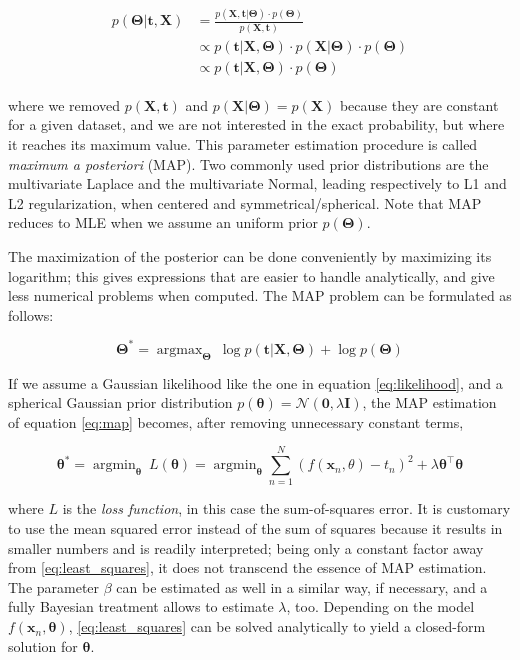 \documentclass[a4paper,11pt]{kth-mag}
\DeclareMathOperator*{\argmin}{argmin}
\DeclareMathOperator*{\argmax}{argmax}
\begin{document}
\begin{align}
\begin{split}
\label{eq:map}
p(\bm\Theta\vert\bm t, \bm X)&=\frac{p(\bm X, \bm t\vert\bm\Theta)\cdot p(\bm\Theta)}{p(\bm X, \bm t)}\\
&\propto p(\bm t\vert \bm X,\bm\Theta)\cdot p(\bm X\vert\bm\Theta)\cdot p(\bm\Theta)\\
&\propto p(\bm t\vert \bm X,\bm\Theta)\cdot p(\bm\Theta)
\end{split}
\end{align}


\noindent where we removed $p(\bm X,\bm t)$ and $p(\bm X\vert\bm\Theta)=p(\bm X)$ because they are constant for a given dataset, and we are not interested in the exact probability, but where it reaches its maximum value. This parameter estimation procedure is called \emph{maximum a posteriori} (MAP). Two commonly used prior distributions are the multivariate Laplace and the multivariate Normal, leading respectively to L1 and L2 regularization, when centered and symmetrical/spherical. Note that MAP reduces to MLE when we assume an uniform prior $p(\bm\Theta)$.

The maximization of the posterior can be done conveniently by maximizing its logarithm; this gives expressions that are easier to handle analytically, and give less numerical problems when computed. The MAP problem can be formulated as follows:

\begin{equation}
\bm\Theta^*=\argmax_{\bm\Theta}\ \log p(\bm t\vert\bm X,\bm\Theta)+\log p(\bm\Theta)
\end{equation}


If we assume a Gaussian likelihood like the one in equation \ref{eq:likelihood}, and a spherical Gaussian prior distribution $p(\bm\theta)=\mathcal{N}(\bm 0, \lambda\bm I)$, the MAP estimation of equation \ref{eq:map} becomes, after removing unnecessary constant terms,

\begin{equation}
\label{eq:least_squares}
\bm\theta^*=\argmin_{\bm\theta}\ L(\bm\theta)=\argmin_{\bm\theta}\sum_{n=1}^N\left( f(\bm x_n,\theta)-t_n\right)^2+\lambda\bm\theta^\intercal\bm\theta
\end{equation}

\noindent where $L$ is the \emph{loss function}, in this case the sum-of-squares error. It is customary to use the mean squared error instead of the sum of squares because it results in smaller numbers and is readily interpreted; being only a constant factor away from \ref{eq:least_squares}, it does not transcend the essence of MAP estimation. The parameter $\beta$ can be estimated as well in a similar way, if necessary, and a fully Bayesian treatment allows to estimate $\lambda$, too. Depending on the model $f(\bm x_n,\bm\theta)$, \ref{eq:least_squares} can be solved analytically to yield a closed-form solution for $\bm\theta$.
 
\end{document}
